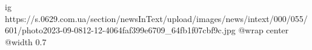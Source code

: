  
 
 
 
 

\ifcmt
  ig https://s.0629.com.ua/section/newsInText/upload/images/news/intext/000/055/601/photo2023-09-0812-12-4064faf399e6709_64fb1f07cbf9c.jpg
  @wrap center
  @width 0.7
\fi
